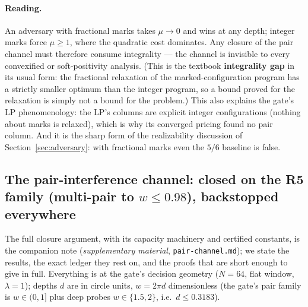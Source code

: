 \documentclass[11pt]{article}
\theoremstyle{plain}
\theoremstyle{definition}
\theoremstyle{remark}
\begin{document}
\paragraph{Reading.}
An adversary with fractional marks takes $\mu \to 0$ and wins at any depth;
integer marks force $\mu \ge 1$, where the quadratic cost dominates. Any closure
of the pair channel must therefore consume integrality --- the channel is
invisible to every convexified or soft-positivity analysis. (This is the textbook
\textbf{integrality gap} in its usual form: the fractional relaxation of the
marked-configuration program has a strictly smaller optimum than the integer program,
so a bound proved for the relaxation is simply not a bound for the problem.) This
also explains
the gate's LP phenomenology: the LP's columns are explicit integer configurations
(nothing about marks is relaxed), which is why its converged pricing found no
pair column. And it is the sharp form of the realizability discussion of
Section~\ref{sec:adversary}: with fractional marks even the $5/6$ baseline is
false.

\subsection[The pair-interference channel: closed on the R5 family (multi-pair
to w <= 0.98), backstopped everywhere]{The pair-interference channel: closed on
the R5 family (multi-pair to $w \le 0.98$), backstopped everywhere}
\label{sec:pairchannel}

The full closure argument, with its capacity machinery and certified constants,
is the companion note (\emph{supplementary material},
\texttt{pair-}\allowbreak\texttt{channel.md}); we state the results, the exact ledger they rest on,
and the proofs that are short enough to give in full. Everything is at the gate's
decision geometry ($N = 64$, flat window, $\lambda = 1$); depths $d$ are in
circle units, $w = 2\pi d$ dimensionless (the gate's pair family is
$w \in (0, 1]$ plus deep probes $w \in \{1.5, 2\}$, i.e.\ $d \le 0.3183$).
\end{document}

